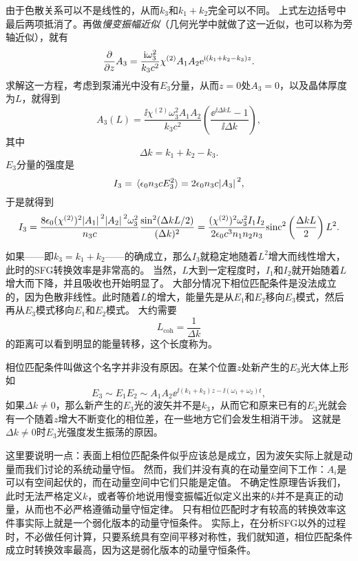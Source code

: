 由于色散关系可以不是线性的，从而$k_3$和$k_1 + k_2$完全可以不同。
上式左边括号中最后两项抵消了。再做\emph{慢变振幅近似}（几何光学中就做了这一近似，也可以称为旁轴近似），就有
\[
    \pdv{z} A_3 = \frac{\mathrm{i} \omega_3^2}{k_3 c^2} \chi^{(2)} A_1 A_2 \mathrm{e}^{\mathrm{i} (k_1 + k_2 - k_3) z}.
\]
求解这一方程，考虑到泵浦光中没有$E_3$分量，从而$z=0$处$A_3=0$，以及晶体厚度为$L$，就得到
\begin{equation}
    A_3(L) = \frac{\ii \chi^{(2)} \omega_3^2 A_1 A_2}{k_3 c^2} \left( \frac{\ee^{\ii \Delta k L} - 1}{\ii \Delta k} \right),
    \label{eq:two-pump-a3}
\end{equation}
其中
\begin{equation}
    \Delta k = k_1 + k_2 - k_3.
\end{equation}
$E_3$分量的强度是
\[
    I_3 = \expval*{\epsilon_0 n_3 c E_3^2} = 2 \epsilon_0 n_3 c \abs*{A_3}^2,
\]
于是就得到
\begin{equation}
    I_3 = \frac{8 \epsilon_0 (\chi^{(2)})^2 \abs*{A_1}^2 \abs*{A_2}^2 \omega_3^2}{n_3 c} \frac{\sin^2(\Delta k L / 2)}{(\Delta k)^2} = \frac{(\chi^{(2)})^2 \omega_3^2 I_1 I_2}{2 \epsilon_0 c^3 n_1 n_2 n_3} \mathrm{sinc}^2 \left( \frac{\Delta k L}{2} \right) L^2.
    \label{eq:sfg-intensity}
\end{equation}

如果——即$k_3 = k_1 + k_2$——的确成立，那么$I_3$就稳定地随着$L^2$增大而线性增大，此时的SFG转换效率是非常高的。
当然，$L$大到一定程度时，$I_1$和$I_2$就开始随着$L$增大而下降，并且吸收也开始明显了。
大部分情况下相位匹配条件是没法成立的，因为色散非线性。此时随着$L$的增大，能量先是从$E_1$和$E_2$移向$E_3$模式，然后再从$E_3$模式移向$E_1$和$E_2$模式。
大约需要
\begin{equation}
    L_\text{coh} = \frac{1}{\Delta k}
\end{equation}
的距离可以看到明显的能量转移，这个长度称为。

相位匹配条件叫做这个名字并非没有原因。在某个位置$z$处新产生的$E_3$光大体上形如
\[
    E_3 \sim E_1 E_2 \sim A_1 A_2 \ee^{\ii (k_1 + k_2) z - \ii (\omega_1 + \omega_2) t},
\]
如果$\Delta k \neq 0$，那么新产生的$E_3$光的波矢并不是$k_3$，从而它和原来已有的$E_3$光就会有一个随着$z$增大不断变化的相位差，在一些地方它们会发生相消干涉。
这就是$\Delta k \neq 0$时$E_3$光强度发生振荡的原因。

这里要说明一点：表面上相位匹配条件似乎应该总是成立，因为波矢实际上就是动量而我们讨论的系统动量守恒。
然而，我们并没有真的在动量空间下工作：$A_i$是可以有空间起伏的，而在动量空间中它们只能是定值。
不确定性原理告诉我们，此时无法严格定义$k$，或者等价地说用慢变振幅近似定义出来的$k$并不是真正的动量，从而也不必严格遵循动量守恒定律。
只有相位匹配时才有较高的转换效率这件事实际上就是一个弱化版本的动量守恒条件。
实际上，在分析SFG以外的过程时，不必做任何计算，只要系统具有空间平移对称性，我们就知道，相位匹配条件成立时转换效率最高，因为这是弱化版本的动量守恒条件。

